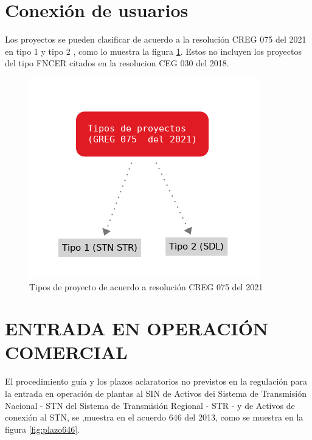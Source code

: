 \documentclass[a5paper]{book}%
\begin{document}
\section{Conexión de usuarios}

Los proyectos se pueden clasificar de acuerdo a la resolución CREG 075
del 2021 en tipo 1 y tipo 2 , como lo muestra la figura
\ref{fig:tipoproyecto}. Estos no incluyen los proyectos del tipo
\ac{FNCER} citados en la resolucion CEG 030 del 2018.


\begin{figure}[H]
  \centering \includegraphics[width=1\linewidth]{tipoproyecto}
  \caption{Tipos de proyecto de acuerdo a resolución CREG 075 del
    2021}
  \label{fig:tipoproyecto}
\end{figure}

    \section{ENTRADA EN OPERACIÓN COMERCIAL}

    El procedimiento guía y los plazos aclaratorios no previstos en la regulación para la entrada en operación de plantas al SIN de Activos dei Sistema de Transmisión Nacional - STN del Sistema de Transmisión Regional - STR - y de Activos de conexión al STN,  se ,muestra en el acuerdo 646 del 2013, como se muestra en la figura \ref{fig:plazo646}.
\end{document}
